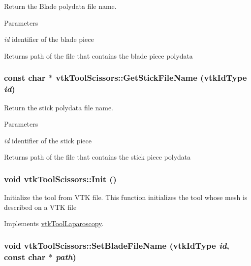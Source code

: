 Return the Blade polydata file name. 
\begin{DoxyParams}{Parameters}
\item[{\em id}]identifier of the blade piece \end{DoxyParams}
\begin{DoxyReturn}{Returns}
path of the file that contains the blade piece polydata 
\end{DoxyReturn}
\hypertarget{classvtkToolScissors_ac99cbf90a47faba5527d4941688c7067}{
\subsubsection[{GetStickFileName}]{\setlength{\rightskip}{0pt plus 5cm}const char $\ast$ vtkToolScissors::GetStickFileName (vtkIdType {\em id})}}
\label{classvtkToolScissors_ac99cbf90a47faba5527d4941688c7067}


Return the stick polydata file name. 
\begin{DoxyParams}{Parameters}
\item[{\em id}]identifier of the stick piece \end{DoxyParams}
\begin{DoxyReturn}{Returns}
path of the file that contains the stick piece polydata 
\end{DoxyReturn}
\hypertarget{classvtkToolScissors_a5fc5884ce0fd1723ecf86888bdbba7a6}{
\subsubsection[{Init}]{\setlength{\rightskip}{0pt plus 5cm}void vtkToolScissors::Init ()}}
\label{classvtkToolScissors_a5fc5884ce0fd1723ecf86888bdbba7a6}


Initialize the tool from VTK file. This function initializes the tool whose mesh is described on a VTK file 

Implements \hyperlink{classvtkToolLaparoscopy_ace75ea21a3ddb27547976ddea0ebb60e}{vtkToolLaparoscopy}.\hypertarget{classvtkToolScissors_a7d769a793faf2cefaf2fd869a7d4d1e3}{
\subsubsection[{SetBladeFileName}]{\setlength{\rightskip}{0pt plus 5cm}void vtkToolScissors::SetBladeFileName (vtkIdType {\em id}, \/  const char $\ast$ {\em path})}}
\label{classvtkToolScissors_a7d769a793faf2cefaf2fd869a7d4d1e3}



